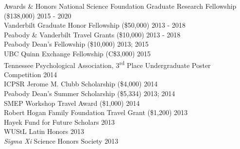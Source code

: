\documentclass {resume}
\begin{document}
\begin{rSection}{\textrm{Awards \& Honors}}
National Science Foundation Graduate Research Fellowship (\$138,000) \hfill{2015 - 2020}\smallskip\\
Vanderbilt Graduate Honor Fellowship (\$50,000)	\hfill  {2013 - 2018}\smallskip\\	
Peabody \& Vanderbilt Travel Grants (\$10,000)      \hfill  {2013 - 2018}\smallskip\\
Peabody Dean's Fellowship (\$10,000)					\hfill  {2013; 2015}\smallskip\\
UBC Quinn Exchange Fellowship (C\$3,000) \hfill{2015}\smallskip\\
Tennessee Psychological Association, 3\textsuperscript{rd} Place Undergraduate Poster Competition \hfill{2014}\smallskip\\
ICPSR Jerome M. Clubb Scholarship (\$4,000) \hfill{2014}\smallskip\\
Peabody Dean's Summer Scholarship (\$5,334)			    \hfill  {2013; 2014}\smallskip\\	
SMEP Workshop Travel Award (\$1,000) \hfill{2014}\smallskip\\
Robert Hogan Family Foundation Travel Grant (\$1,200) 	\hfill  {2013}\smallskip\\
Hayek Fund for Future Scholars                      \hfill  {2013}\smallskip\\
WUStL Latin Honors \hfill  {2013}\smallskip\\
\textit{Sigma Xi} Science Honors Society                    			\hfill  {2013}%
\end{rSection}
\end{document}
